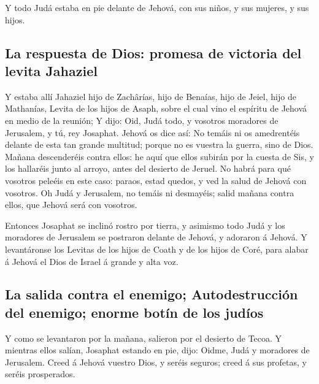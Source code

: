  Y todo Judá estaba en pie delante de Jehová, con sus
niños, y sus mujeres, y sus hijos.

\hypertarget{la-respuesta-de-dios-promesa-de-victoria-del-levita-jahaziel}{%
\subsection{La respuesta de Dios: promesa de victoria del levita
Jahaziel}\label{la-respuesta-de-dios-promesa-de-victoria-del-levita-jahaziel}}

 Y estaba allí Jahaziel hijo de Zachârías, hijo de
Benaías, hijo de Jeiel, hijo de Mathanías, Levita de los hijos de Asaph,
sobre el cual vino el espíritu de Jehová en medio de la reunión;
 Y dijo: Oid, Judá todo, y vosotros moradores de
Jerusalem, y tú, rey Josaphat. Jehová os dice así: No temáis ni os
amedrentéis delante de esta tan grande multitud; porque no es vuestra la
guerra, sino de Dios.  Mañana descenderéis contra ellos:
he aquí que ellos subirán por la cuesta de Sis, y los hallaréis junto al
arroyo, antes del desierto de Jeruel.  No habrá para qué
vosotros peleéis en este caso: paraos, estad quedos, y ved la salud de
Jehová con vosotros. Oh Judá y Jerusalem, no temáis ni desmayéis; salid
mañana contra ellos, que Jehová será con vosotros.

 Entonces Josaphat se inclinó rostro por tierra, y
asimismo todo Judá y los moradores de Jerusalem se postraron delante de
Jehová, y adoraron á Jehová.  Y levantáronse los Levitas
de los hijos de Coath y de los hijos de Coré, para alabar á Jehová el
Dios de Israel á grande y alta voz.

\hypertarget{la-salida-contra-el-enemigo-autodestrucciuxf3n-del-enemigo-enorme-botuxedn-de-los-juduxedos}{%
\subsection{La salida contra el enemigo; Autodestrucción del enemigo;
enorme botín de los
judíos}\label{la-salida-contra-el-enemigo-autodestrucciuxf3n-del-enemigo-enorme-botuxedn-de-los-juduxedos}}

 Y como se levantaron por la mañana, salieron por el
desierto de Tecoa. Y mientras ellos salían, Josaphat estando en pie,
dijo: Oidme, Judá y moradores de Jerusalem. Creed á Jehová vuestro Dios,
y seréis seguros; creed á sus profetas, y seréis prosperados.

